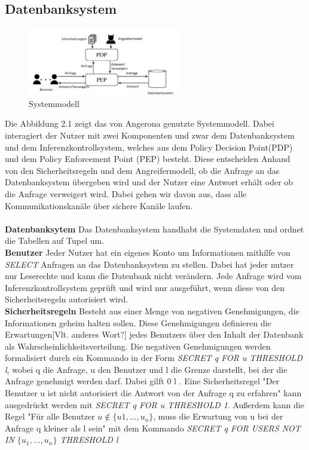 \documentclass[german,version-2020-11]{uzl-thesis}
\begin{document}
\subsection{Datenbanksystem}
\begin{figure}[ht]
	\centering
	\includegraphics[width=0.6\textwidth]{System-model.PNG}
	\caption{Systemmodell}
	\label{fig1}
	\end{figure}
Die Abbildung 2.1 zeigt das von Angerona genutzte Systemmodell. Dabei interagiert der Nutzer mit zwei Komponenten und zwar dem Datenbanksystem und dem Inferenzkontrollsystem, welches aus dem Policy Decision Point(PDP) und dem Policy Enforcement Point (PEP) besteht. Diese entscheiden Anhand von den Sicherheitsregeln und dem Angreifermodell, ob die Anfrage an das Datenbanksystem übergeben wird und der Nutzer eine Antwort erhält oder ob die Anfrage verweigert wird. Dabei gehen wir davon aus, dass alle Kommunikationskanäle über sichere Kanäle laufen. \\ \\ 
\textbf{Datenbanksytem} Das Datenbanksystem handhabt die Systemdaten und ordnet die Tabellen auf Tupel um.    \\  
\textbf{Benutzer} Jeder Nutzer hat ein eigenes Konto um Informationen mithilfe von \textit{SELECT} Anfragen an das Datenbanksystem zu stellen. Dabei hat jeder nutzer nur Leserechte und kann die Datenbank nicht verändern. Jede Anfrage wird vom Inferenzkontrollsystem geprüft und wird nur ausgeführt, wenn diese von den Sicherheitsregeln autorisiert wird. \\ 
\textbf{Sicherheitsregeln} Besteht aus einer Menge von negativen Genehmigungen, die Informationen geheim halten sollen. Diese Genehmigungen definieren die Erwartungen[Vlt. anderes Wort?] jedes Benutzers über den Inhalt der Datenbank als Wahrscheinlichkeitsverteilung. Die negativen Genehmigungen werden formalisiert durch ein Kommando in der Form \textit{SECRET q FOR u THRESHOLD l}, wobei q die Anfrage, u den Benutzer und l die Grenze darstellt, bei der die Anfrage genehmigt werden darf. Dabei gilft 0 \leq l . Eine Sicherheitsregel "Der Benutzer u ist nicht autorisiert die Antwort von der Anfrage q zu erfahren" kann ausgedrückt werden mit \textit{SECRET q FOR u THRESHOLD 1}. Außerdem kann die Regel "Für alle Benutzer $u \notin \{u1,...,u_n\}$, muss die Erwartung von u bei der Anfrage q kleiner als l sein" mit dem Kommando \textit{SECRET q FOR USERS NOT IN $\{u_1,...,u_n\}$ THRESHOLD l}\\ 
\end{document}
